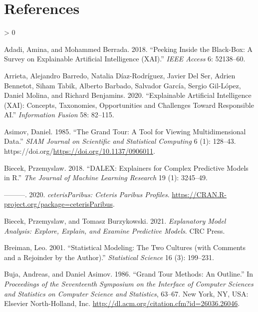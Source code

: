 \documentclass[
  article]{article}
\newlength{\cslhangindent}
\newenvironment{CSLReferences}[2] %
 {%
  \setlength{\parindent}{0pt}
  \ifodd #1 \everypar{\setlength{\hangindent}{\cslhangindent}}\ignorespaces\fi
  \ifnum #2 > 0
  \setlength{\parskip}{#2\baselineskip}
  \fi
 }%
 {}
\begin{document}
\hypertarget{references}{%
\section*{References}\label{references}}

\hypertarget{refs}{}
\begin{CSLReferences}{1}{0}
\leavevmode\hypertarget{ref-adadi_peeking_2018}{}%
Adadi, Amina, and Mohammed Berrada. 2018. {``Peeking Inside the Black-Box: A Survey on Explainable Artificial Intelligence ({XAI}).''} \emph{IEEE Access} 6: 52138--60.

\leavevmode\hypertarget{ref-arrieta_explainable_2020}{}%
Arrieta, Alejandro Barredo, Natalia Díaz-Rodríguez, Javier Del Ser, Adrien Bennetot, Siham Tabik, Alberto Barbado, Salvador García, Sergio Gil-López, Daniel Molina, and Richard Benjamins. 2020. {``Explainable {Artificial} {Intelligence} ({XAI}): {Concepts}, Taxonomies, Opportunities and Challenges Toward Responsible {AI}.''} \emph{Information Fusion} 58: 82--115.

\leavevmode\hypertarget{ref-asimov_grand_1985}{}%
Asimov, Daniel. 1985. {``The {Grand} {Tour}: A {Tool} for {Viewing} {Multidimensional} {Data}.''} \emph{SIAM Journal on Scientific and Statistical Computing} 6 (1): 128--43. https://doi.org/\url{https://doi.org/10.1137/0906011}.

\leavevmode\hypertarget{ref-biecek_dalex_2018}{}%
Biecek, Przemyslaw. 2018. {``{DALEX}: Explainers for Complex Predictive Models in {R}.''} \emph{The Journal of Machine Learning Research} 19 (1): 3245--49.

\leavevmode\hypertarget{ref-biecek_ceterisparibus_2020}{}%
---------. 2020. \emph{{ceterisParibus}: {Ceteris} {Paribus} {Profiles}}. \url{https://CRAN.R-project.org/package=ceterisParibus}.

\leavevmode\hypertarget{ref-biecek_explanatory_2021}{}%
Biecek, Przemyslaw, and Tomasz Burzykowski. 2021. \emph{Explanatory {Model} {Analysis}: {Explore}, {Explain}, and {Examine} {Predictive} {Models}}. CRC Press.

\leavevmode\hypertarget{ref-breiman_statistical_2001}{}%
Breiman, Leo. 2001. {``Statistical Modeling: {The} Two Cultures (with Comments and a Rejoinder by the Author).''} \emph{Statistical Science} 16 (3): 199--231.

\leavevmode\hypertarget{ref-buja_grand_1986}{}%
Buja, Andreas, and Daniel Asimov. 1986. {``Grand {Tour} {Methods}: {An} {Outline}.''} In \emph{Proceedings of the {Seventeenth} {Symposium} on the {Interface} of {Computer} {Sciences} and {Statistics} on {Computer} {Science} and {Statistics}}, 63--67. New York, NY, USA: Elsevier North-Holland, Inc. \url{http://dl.acm.org/citation.cfm?id=26036.26046}.


\end{CSLReferences}
\end{document}
